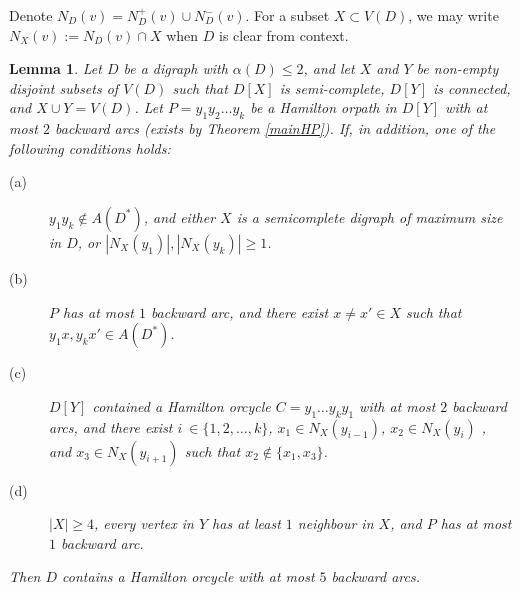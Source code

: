 \documentclass{article}
\newcommand{\2}{\vspace{2mm}}
\newtheorem{lemma}[theorem]{Lemma}
\theoremstyle{definition}
\begin{document}
Denote $N_D(v)=N^+_D(v) \cup N^-_D(v)$. For a subset $X \subset V(D)$, we may write $N_X(v) := N_D(v) \cap X$ when $D$ is clear from context.

\begin{lemma}\label{DipathPlusSemi}
Let $D$ be a digraph with $\alpha(D)\le 2$, and let $X$ and $Y$ be non-empty disjoint subsets of $V(D)$ such that $D[X]$ is semi-complete, $D[Y]$ is connected, and $X \cup Y=V(D)$. Let $P=y_1y_2\dots y_k$ be a Hamilton orpath in $D[Y]$ with at most $2$ backward arcs (exists by  Theorem \ref{mainHP}). 
If, in addition, one of the following conditions holds:
\begin{description}
\item[(a)] $y_1y_k \notin A(D^*)$, and either $X$ is a semicomplete digraph of maximum size in $D$, or $|N_X(y_1)|,|N_X(y_k)| \ge 1$.

\item[(b)] $P$ has at most $1$ backward arc, and there exist $x \neq x' \in X $ such that $y_1x, y_kx' \in A(D^*)$.

\item[(c)] $D[Y]$ contained a Hamilton orcycle $C=y_1\dots y_ky_1$ with at most $2$ backward arcs, and there exist $i~\in \{1,2,\dots,k\}$, $x_1\in N_X(y_{i-1})$, $x_2\in N_X(y_i)$ , and $x_3\in N_X(y_{i+1})$ such that $x_2 \notin \{x_1,x_3\}$.

\item[(d)] $|X| \ge 4$, every vertex in $Y$ has at least $1$ neighbour in $X$, and $P$ has at most $1$ backward arc.
\end{description}
Then $D$ contains a Hamilton orcycle with at most $5$ backward arcs.
\end{lemma}
\end{document}
